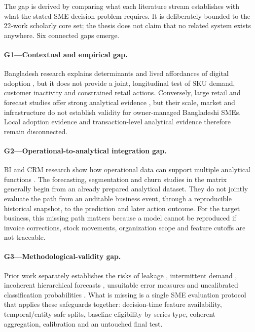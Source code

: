 The gap is derived by comparing what each literature stream establishes with
what the stated SME decision problem requires. It is deliberately bounded to
the 22-work scholarly core set; the thesis does not claim that no related system exists
anywhere. Six connected gaps emerge.

\paragraph{G1---Contextual and empirical gap.}
Bangladesh research explains determinants and lived affordances of digital
adoption \cite{hoque2016ict,shahadat2023digital,hazra2021mfs}, but it does not
provide a joint, longitudinal test of SKU demand, customer inactivity and
constrained retail actions. Conversely, large retail and forecast studies offer
strong analytical evidence \cite{makridakis2022m5,fildes2022retail}, but their
scale, market and infrastructure do not establish validity for owner-managed
Bangladeshi SMEs. Local adoption evidence and transaction-level analytical
evidence therefore remain disconnected.

\paragraph{G2---Operational-to-analytical integration gap.}
BI and CRM research show how operational data can support multiple analytical
functions \cite{chen2012business}. The forecasting, segmentation and
churn studies in the matrix generally begin from an already prepared analytical
dataset. They do not jointly evaluate the path from an auditable business event,
through a reproducible historical snapshot, to the prediction and later action
outcome. For the target business, this missing path matters because a model cannot be
reproduced if invoice corrections, stock movements, organization scope and
feature cutoffs are not traceable.

\paragraph{G3---Methodological-validity gap.}
Prior work separately establishes the risks of leakage
\cite{kaufman2012leakage}, intermittent demand
\cite{croston1972intermittent,syntetos2005intermittent}, incoherent hierarchical
forecasts \cite{hyndman2011hierarchical}, unsuitable error measures
\cite{hyndman2006accuracy} and uncalibrated classification probabilities
\cite{niculescu2005calibration}. What is missing is a single SME evaluation
protocol that applies these safeguards together: decision-time feature
availability, temporal/entity-safe splits, baseline eligibility by series type,
coherent aggregation, calibration and an untouched final test.

